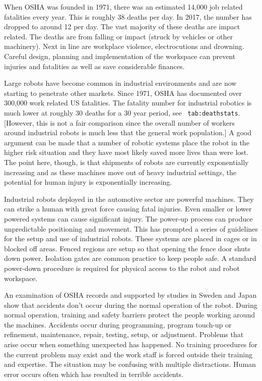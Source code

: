 When OSHA was founded in 1971, there was an estimated 14,000 job related
fatalities every year. This is roughly 38 deaths per day. In 2017, the
number has dropped to around 12 per day. The vast majority of these
deaths are impact related. The deaths are from falling or impact (struck
by vehicles or other machinery). Next in line are workplace violence,
electrocutions and drowning. Careful design, planning and implementation
of the workspace can prevent injuries and fatalities as well as save
considerable finances.

Large robots have become common in industrial environments and are now
starting to penetrate other markets. Since 1971, OSHA has documented
over 300,000 work related US fatalities. The fatality number for
industrial robotics is much lower at roughly 30 deaths for a 30 year
period, see ~\texttt{tab:deathstats}. {[}However, this is not a fair
comparison since the overall number of workers around industrial robots
is much less that the general work population.{]} A good argument can be
made that a number of robotic systems place the robot in the higher risk
situation and they have most likely saved more lives than were lost. The
point here, though, is that shipments of robots are currently
exponentially increasing and as these machines move out of heavy
industrial settings, the potential for human injury is exponentially
increasing.

Industrial robots deployed in the automotive sector are powerful
machines. They can strike a human with great force causing fatal
injuries. Even smaller or lower powered systems can cause significant
injury. The power-up process can produce unpredictable positioning and
movement. This has prompted a series of guidelines for the setup and use
of industrial robots. These systems are placed in cages or in blocked
off areas. Fenced regions are setup so that opening the fence door shuts
down power. Isolation gates are common practice to keep people safe. A
standard power-down procedure is required for physical access to the
robot and robot workspace.

An examination of OSHA records and supported by studies in Sweden and
Japan show that accidents don't occur during the normal operation of the
robot. During normal operation, training and safety barriers protect the
people working around the machines. Accidents occur during programming,
program touch-up or refinement, maintenance, repair, testing, setup, or
adjustment. Problems that arise occur when something unexpected has
happened. No training procedures for the current problem may exist and
the work staff is forced outside their training and expertise. The
situation may be confusing with multiple distractions. Human error
occurs often which has resulted in terrible accidents.


